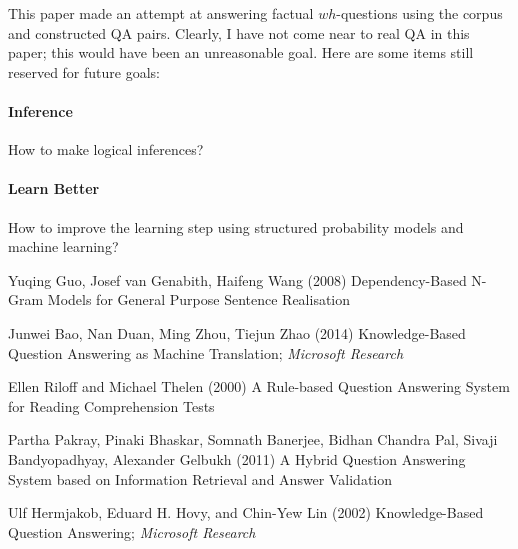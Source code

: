 \documentclass[twoside]{article}
\begin{document}
This paper made an attempt at answering factual $wh$-questions using the corpus and constructed QA pairs.  Clearly, I have not come near to real QA in this paper;  this would have been an unreasonable goal.  Here are some items still reserved for future goals:

\paragraph{Inference} How to make logical inferences?
\paragraph{Learn Better} How to improve the learning step using structured probability models and machine learning?


\begin{thebibliography}{9} %

Yuqing Guo, Josef van Genabith, Haifeng Wang (2008)
\newblock Dependency-Based N-Gram Models for
General Purpose Sentence Realisation

Junwei Bao, Nan Duan, Ming Zhou, Tiejun Zhao (2014)
\newblock Knowledge-Based Question Answering as Machine Translation; \textit{Microsoft Research}
 
Ellen Riloff and Michael Thelen  (2000)
\newblock A Rule-based Question Answering System for Reading Comprehension Tests

Partha Pakray, Pinaki Bhaskar, Somnath Banerjee, Bidhan Chandra Pal, Sivaji Bandyopadhyay, Alexander Gelbukh (2011)
\newblock A Hybrid Question Answering System based on Information Retrieval and Answer Validation

Ulf Hermjakob, Eduard H. Hovy, and Chin-Yew Lin (2002)
\newblock Knowledge-Based Question Answering; \textit{Microsoft Research}

\end{thebibliography}

\end{document}
